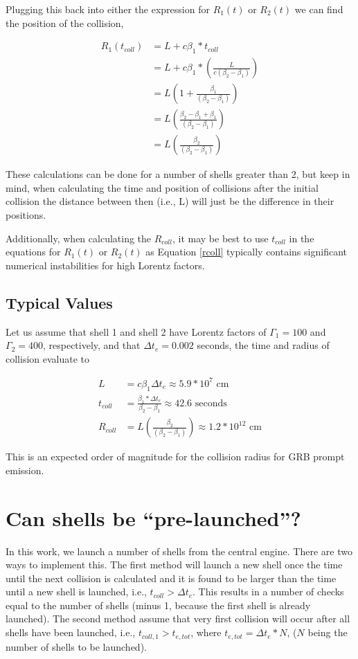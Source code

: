 \documentclass[10pt]{article}
\begin{document}
Plugging this back into either the expression for $R_1(t)$ or $R_2(t)$ we can find the position of the collision,

\begin{align}
	R_1(t_{coll}) &= L+c\beta_1*t_{coll}\\
	&= L+c\beta_1*(\frac{L}{c(\beta_2 - \beta_1)})\\
	&= L(1+ \frac{\beta_1}{(\beta_2 - \beta_1)})\\
	&= L(\frac{\beta_2 - \beta_1 + \beta_1}{(\beta_2 - \beta_1)})\\
	&= L(\frac{\beta_2}{(\beta_2 - \beta_1)}) \label{rcoll}
\end{align}

These calculations can be done for a number of shells greater than 2, but keep in mind, when calculating the time and position of collisions after the initial collision the distance between then (i.e., L) will just be the difference in their positions.

Additionally, when calculating the $R_{coll}$, it may be best to use $t_{coll}$ in the equations for $R_1(t)$ or $R_2(t)$ as Equation \ref{rcoll} typically contains significant numerical instabilities for high Lorentz factors.

\subsection*{Typical Values}

Let us assume that shell 1 and shell 2 have Lorentz factors of $\Gamma_1=100$ and $\Gamma_2=400$, respectively, and that $\Delta t_e = 0.002$ seconds, the time and radius of collision evaluate to

\begin{align}
	L &= c\beta_1\Delta t_e \approx 5.9*10^7 \text{ cm}\\
	t_{coll} &= \frac{\beta_1 * \Delta t_e}{\beta_2 - \beta_1} \approx 42.6 \text{ seconds}\\
	R_{coll} &= L(\frac{\beta_2}{(\beta_2 - \beta_1)}) \approx 1.2*10^{12} \text{ cm}
\end{align}

This is an expected order of magnitude for the collision radius for GRB prompt emission.

\section*{Can shells be ``pre-launched''?}

In this work, we launch a number of shells from the central engine. There are two ways to implement this. The first method will launch a new shell once the time until the next collision is calculated and it is found to be larger than the time until a new shell is launched, i.e., $t_{coll} > \Delta t_e$. This results in a number of checks equal to the number of shells (minus 1, because the first shell is already launched). The second method assume that very first collision will occur after all shells have been launched, i.e., $t_{coll,1} > t_{e,tot}$, where $t_{e,tot} = \Delta t_e * N$, ($N$ being the number of shells to be launched). 
\end{document}

